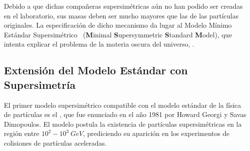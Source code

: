 Debido a que dichas compañeras supersimétricas aún no han podido ser creadas en el laboratorio, sus masas deben ser mucho mayores que las de las partículas originales. %
La especificación de dicho mecanismo da lugar al Modelo Mínimo Estándar Supersimétrico \MSSM~(\textbf{M}inimal \textbf{S}upersymmetric \textbf{S}tandard \textbf{M}odel), que intenta explicar el problema de la materia oscura del universo, \citep{MSSM_1, MSSM_2}.




\subsection{Extensión del Modelo Estándar con Supersimetría}
 




El primer modelo supersimétrico compatible con el modelo estándar de la física de partículas es el \MSSM, que fue enunciado en el año 1981 por Howard Georgi y Savas Dimopoulos. El modelo postula la existencia de partículas supersimétricas en la región entre $10^2-10^3~GeV$, prediciendo su aparición en los experimentos de colisiones de partículas aceleradas. %

